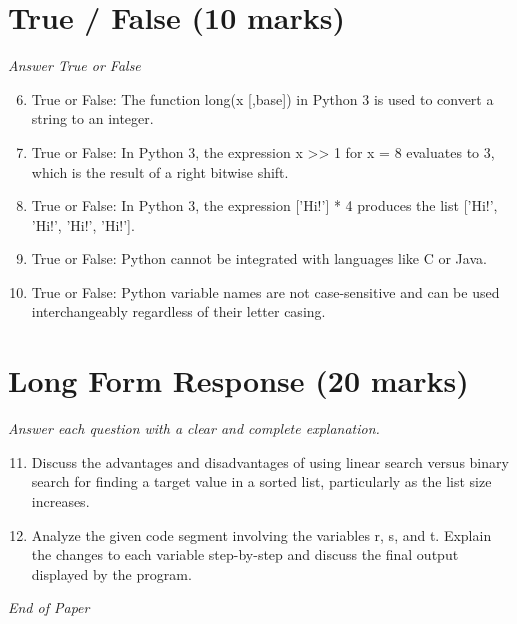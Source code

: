\documentclass[12pt]{article}
\begin{document}
\section*{True / False (10 marks)}
\textit{Answer True or False}
\begin{enumerate}[label=\arabic*.]
\setcounter{enumi}{5}
\item True or False: The function long(x [,base]) in Python 3 is used to convert a string to an integer.
\item True or False: In Python 3, the expression x \textgreater{}\textgreater{} 1 for x = 8 evaluates to 3, which is the result of a right bitwise shift.
\item True or False: In Python 3, the expression ['Hi!'] * 4 produces the list ['Hi!', 'Hi!', 'Hi!', 'Hi!'].
\item True or False: Python cannot be integrated with languages like C or Java.
\item True or False: Python variable names are not case-sensitive and can be used interchangeably regardless of their letter casing.
\end{enumerate}

\section*{Long Form Response (20 marks)}
\textit{Answer each question with a clear and complete explanation.}
\begin{enumerate}[label=\arabic*.]
\setcounter{enumi}{10}
\item Discuss the advantages and disadvantages of using linear search versus binary search for finding a target value in a sorted list, particularly as the list size increases.
\item Analyze the given code segment involving the variables r, s, and t. Explain the changes to each variable step-by-step and discuss the final output displayed by the program.
\end{enumerate}

\vfill
\noindent\textit{End of Paper}
\end{document}
